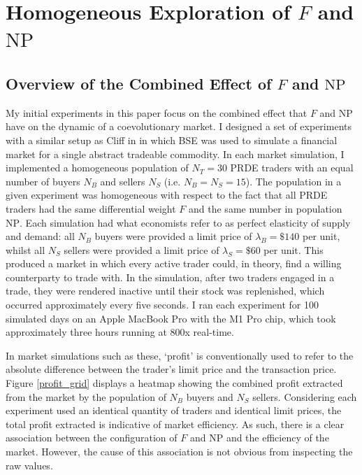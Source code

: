 \documentclass[conference]{IEEEtran}
\begin{document}
\section{Homogeneous Exploration of $F$ and $\mathrm{NP}$}

\subsection{Overview of the Combined Effect of $F$ and $\mathrm{NP}$}

My initial experiments in this paper focus on the combined effect that $F$ and $\mathrm{NP}$ have on the dynamic of a coevolutionary market.
I designed a set of experiments with a similar setup as Cliff in \cite{PRDE} in which BSE was used to simulate a financial market for a single abstract tradeable commodity.
In each market simulation, I implemented a homogeneous population of $N_T=30$ PRDE traders with an equal number of buyers $N_B$ and sellers $N_S$ (i.e. $N_B=N_S=15$).
The population in a given experiment was homogeneous with respect to the fact that all PRDE traders had the same differential weight $F$ and the same number in population $\mathrm{NP}$.
Each simulation had what economists refer to as perfect elasticity of supply and demand: all $N_B$ buyers were provided a limit price of $\lambda_B=\$140$ per unit, whilst all $N_S$ sellers were provided a limit price of $\lambda_S=\$60$ per unit.
This produced a market in which every active trader could, in theory, find a willing counterparty to trade with.
In the simulation, after two traders engaged in a trade, they were rendered inactive until their stock was replenished, which occurred approximately every five seconds.
I ran each experiment for 100 simulated days on an Apple MacBook Pro with the M1 Pro chip, which took approximately three hours running at 800x real-time.

In market simulations such as these, `profit' is conventionally used to refer to the absolute difference between the trader's limit price and the transaction price.
Figure \ref{profit_grid} displays a heatmap showing the combined profit extracted from the market by the population of $N_B$ buyers and $N_S$ sellers.
Considering each experiment used an identical quantity of traders and identical limit prices, the total profit extracted is indicative of market efficiency.
As such, there is a clear association between the configuration of $F$ and $\mathrm{NP}$ and the efficiency of the market.
However, the cause of this association is not obvious from inspecting the raw values.
\end{document}
